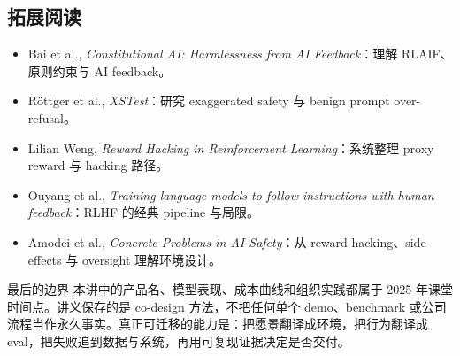 \documentclass[a4paper]{article}
\begin{document}
\subsection{拓展阅读}

\begin{itemize}
  \item Bai et al., \emph{Constitutional AI: Harmlessness from AI Feedback}：理解 RLAIF、原则约束与 AI feedback。
  \item Röttger et al., \emph{XSTest}：研究 exaggerated safety 与 benign prompt over-refusal。
  \item Lilian Weng, \emph{Reward Hacking in Reinforcement Learning}：系统整理 proxy reward 与 hacking 路径。
  \item Ouyang et al., \emph{Training language models to follow instructions with human feedback}：RLHF 的经典 pipeline 与局限。
  \item Amodei et al., \emph{Concrete Problems in AI Safety}：从 reward hacking、side effects 与 oversight 理解环境设计。
\end{itemize}

\begin{warningbox}{最后的边界}
本讲中的产品名、模型表现、成本曲线和组织实践都属于 2025 年课堂时间点。讲义保存的是 co-design 方法，不把任何单个 demo、benchmark 或公司流程当作永久事实。真正可迁移的能力是：把愿景翻译成环境，把行为翻译成 eval，把失败追到数据与系统，再用可复现证据决定是否交付。
\end{warningbox}
\end{document}
